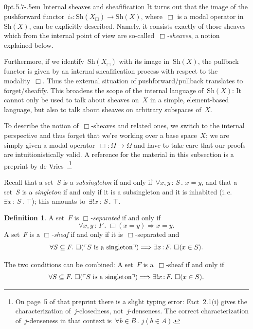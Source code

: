 \documentclass[10pt,reqno,a4paper]{amsbook}
\makeatletter
\theoremstyle{definition}
\newtheorem{defn}{Definition}[section]
\theoremstyle{plain}
\theoremstyle{remark}
\newcommand{\Sh}{\mathrm{Sh}}
\newcommand{\?}{\,{:}\,}
\renewcommand{\_}{\mathpunct{.}\,}
\newcommand{\speak}[1]{\ulcorner\text{\textnormal{#1}}\urcorner}
\newcommand{\ie}{i.\,e.\@\xspace}
\def\subsection{\@startsection{subsection}{2}%
  {0pt}{.5\linespacing\@plus.7\linespacing}{-.5em}%
  {\normalfont\bfseries}}
\makeatother
\begin{document}
\subsection{Internal sheaves and sheafification}\label{sect:internal-sheaves}
It turns out that the image of
the pushforward functor~$i_* : \Sh(X_\Box) \to \Sh(X)$, where~$\Box$ is a modal
operator in~$\Sh(X)$, can be explicitly described. Namely, it consists exactly
of those sheaves which from the internal point of view
are so-called~\emph{$\Box$-sheaves}, a notion explained below.

Furthermore, if we identify~$\Sh(X_\Box)$ with its image in~$\Sh(X)$, the
pullback functor is given by an internal sheafification process with respect to
the modality~$\Box$. Thus the external situation of pushforward/pullback
translates to forget/sheafify. This broadens the scope of the internal
language of~$\Sh(X)$: It cannot only be used to talk about sheaves on~$X$ in a simple,
element-based language, but also to talk about sheaves on arbitrary subspaces
of~$X$.

To describe the notion of~$\Box$-sheaves and related ones, we switch to the internal
perspective and thus forget that we're working over a base space~$X$; we are simply given a modal operator~$\Box :
\Omega \to \Omega$ and have to take care that our proofs are intuitionistically valid. A
reference for the material in this subsection is a preprint by de
Vries~\cite{vries:sheafification}.\footnote{On page~5 of that
preprint there is a slight typing error: Fact~2.1(i) gives the
characterization of~$j$-closedness, not~$j$-denseness. The correct
characterization of~$j$-denseness in that context is~$\forall b \in B\_ j(b \in
A)$.}

Recall that a set~$S$ is a \emph{subsingleton} if and only if~$\forall x,y\?S\_
x = y$, and that a set~$S$ is a \emph{singleton} if and only if it is a subsingleton and
it is inhabited (\ie~$\exists x\?S\_ \top$); this amounts to~$\exists!x\?S\_ \top$.

\begin{defn}\label{defn:box-sheaves}
A set~$F$ is \emph{$\Box$-separated} if and only if
\[ \forall x,y\?F\_ \Box(x = y) \Longrightarrow x = y. \]
A set~$F$ is a \emph{$\Box$-sheaf} if and only if it is~$\Box$-separated and
\[ \forall S \subseteq F\_
  \Box(\speak{$S$ is a singleton}) \Longrightarrow
  \exists x\?F\_ \Box(x \in S). \]
\end{defn}

The two conditions can be combined: A set~$F$ is a~$\Box$-sheaf if and only if
\[ \forall S \subseteq F\_
  \Box(\speak{$S$ is a singleton}) \Longrightarrow
  \exists! x\?F\_ \Box(x \in S). \]
\end{document}
